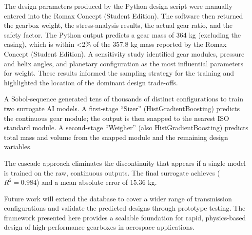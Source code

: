 	The design parameters produced by the Python design script were manually entered into the Romax Concept (Student Edition). 
	The software then returned the gearbox weight, the stress-analysis results, the actual gear ratio, and the safety factor. 
	The Python output predicts a gear mass of 364 kg (excluding the casing), which is within <2\% of the 357.8 kg mass reported by the 
	Romax Concept (Student Edition). 
	A sensitivity study identified gear modules, pressure and helix angles, and planetary configuration as the most influential 
	parameters for weight. These results informed the sampling strategy for the training and highlighted the location of the 
	dominant design trade-offs. 

	A Sobol-sequence generated tens of thousands of distinct configurations to train two surrogate AI models. 
	A first-stage “Sizer” (HistGradientBoosting) predicts the continuous gear module; the output is then snapped 
	to the nearest ISO standard module. A second-stage “Weigher” (also HistGradientBoosting) predicts total mass 
	and volume from the snapped module and the remaining design variables.  

	The cascade approach eliminates the discontinuity that appears if a single model is trained on the 
	raw, continuous outputs. The final surrogate achieves ($R^{2}=0.984$) and a mean absolute error of 15.36 kg. 

	Future work will extend the database to cover a wider range of transmission configurations and 
	validate the predicted designs through prototype testing. The framework presented here provides a 
	scalable foundation for rapid, physics-based design of high-performance gearboxes in aerospace applications. 